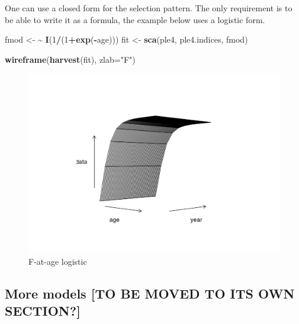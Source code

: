 \documentclass[
]{book}
\newenvironment{Shaded}{\begin{snugshade}}{\end{snugshade}}
\newcommand{\AttributeTok}[1]{\textcolor[rgb]{0.13,0.29,0.53}{#1}}
\newcommand{\DecValTok}[1]{\textcolor[rgb]{0.00,0.00,0.81}{#1}}
\newcommand{\ErrorTok}[1]{\textcolor[rgb]{0.64,0.00,0.00}{\textbf{#1}}}
\newcommand{\FunctionTok}[1]{\textcolor[rgb]{0.13,0.29,0.53}{\textbf{#1}}}
\newcommand{\NormalTok}[1]{#1}
\newcommand{\OtherTok}[1]{\textcolor[rgb]{0.56,0.35,0.01}{#1}}
\newcommand{\SpecialCharTok}[1]{\textcolor[rgb]{0.81,0.36,0.00}{\textbf{#1}}}
\newcommand{\StringTok}[1]{\textcolor[rgb]{0.31,0.60,0.02}{#1}}
\begin{document}
One can use a closed form for the selection pattern. The only requirement is to be able to write it as a \R formula, the example below uses a logistic form.

\begin{Shaded}
\begin{Highlighting}[]
\NormalTok{fmod }\OtherTok{\textless{}{-}} \ErrorTok{\textasciitilde{}} \FunctionTok{I}\NormalTok{(}\DecValTok{1}\SpecialCharTok{/}\NormalTok{(}\DecValTok{1}\SpecialCharTok{+}\FunctionTok{exp}\NormalTok{(}\SpecialCharTok{{-}}\NormalTok{age)))}
\NormalTok{fit }\OtherTok{\textless{}{-}} \FunctionTok{sca}\NormalTok{(ple4, ple4.indices, fmod)}
\end{Highlighting}
\end{Shaded}

\begin{Shaded}
\begin{Highlighting}[]
\FunctionTok{wireframe}\NormalTok{(}\FunctionTok{harvest}\NormalTok{(fit), }\AttributeTok{zlab=}\StringTok{"F"}\NormalTok{)}
\end{Highlighting}
\end{Shaded}

\begin{figure}
\centering
\includegraphics{_bookdown_files/_main_files/figure-html/logistic-1.png}
\caption{\label{fig:logistic}F-at-age logistic}
\end{figure}

\hypertarget{more-models-to-be-moved-to-its-own-section}{%
\subsection{More models {[}TO BE MOVED TO ITS OWN SECTION?{]}}\label{more-models-to-be-moved-to-its-own-section}}
\end{document}

